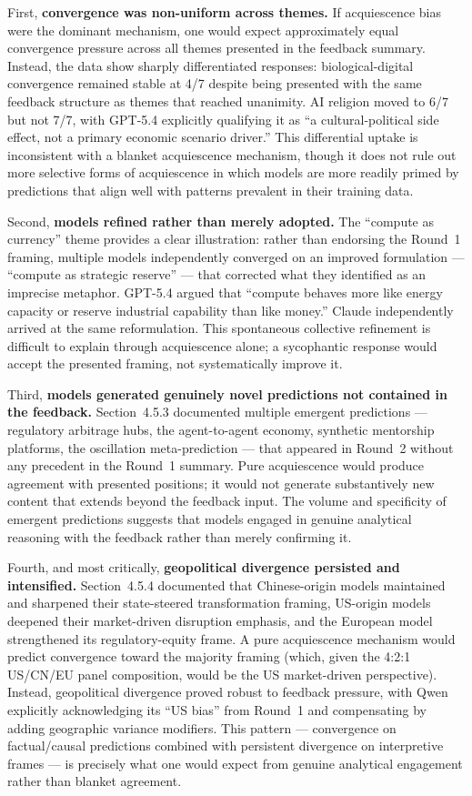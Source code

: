 \documentclass[preprint,review,12pt]{elsarticle}
\begin{document}
First, \textbf{convergence was non-uniform across themes.} If acquiescence bias were the dominant mechanism, one would expect approximately equal convergence pressure across all themes presented in the feedback summary. Instead, the data show sharply differentiated responses: biological-digital convergence remained stable at 4/7 despite being presented with the same feedback structure as themes that reached unanimity. AI religion moved to 6/7 but not 7/7, with GPT-5.4 explicitly qualifying it as ``a cultural-political side effect, not a primary economic scenario driver.'' This differential uptake is inconsistent with a blanket acquiescence mechanism, though it does not rule out more selective forms of acquiescence in which models are more readily primed by predictions that align well with patterns prevalent in their training data.

Second, \textbf{models refined rather than merely adopted.} The ``compute as currency'' theme provides a clear illustration: rather than endorsing the Round~1 framing, multiple models independently converged on an improved formulation --- ``compute as strategic reserve'' --- that corrected what they identified as an imprecise metaphor. GPT-5.4 argued that ``compute behaves more like energy capacity or reserve industrial capability than like money.'' Claude independently arrived at the same reformulation. This spontaneous collective refinement is difficult to explain through acquiescence alone; a sycophantic response would accept the presented framing, not systematically improve it.

Third, \textbf{models generated genuinely novel predictions not contained in the feedback.} Section~4.5.3 documented multiple emergent predictions --- regulatory arbitrage hubs, the agent-to-agent economy, synthetic mentorship platforms, the oscillation meta-prediction --- that appeared in Round~2 without any precedent in the Round~1 summary. Pure acquiescence would produce agreement with presented positions; it would not generate substantively new content that extends beyond the feedback input. The volume and specificity of emergent predictions suggests that models engaged in genuine analytical reasoning with the feedback rather than merely confirming it.

Fourth, and most critically, \textbf{geopolitical divergence persisted and intensified.} Section~4.5.4 documented that Chinese-origin models maintained and sharpened their state-steered transformation framing, US-origin models deepened their market-driven disruption emphasis, and the European model strengthened its regulatory-equity frame. A pure acquiescence mechanism would predict convergence toward the majority framing (which, given the 4:2:1 US/CN/EU panel composition, would be the US market-driven perspective). Instead, geopolitical divergence proved robust to feedback pressure, with Qwen explicitly acknowledging its ``US bias'' from Round~1 and compensating by adding geographic variance modifiers. This pattern --- convergence on factual/causal predictions combined with persistent divergence on interpretive frames --- is precisely what one would expect from genuine analytical engagement rather than blanket agreement.
\end{document}
